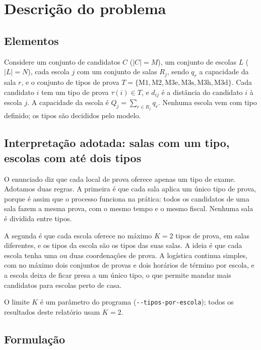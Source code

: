 \documentclass[12pt]{article}
\begin{document}
\section{Descrição do problema}\label{sec:problema}

\subsection{Elementos}

Considere um conjunto de candidatos $C$ ($|C| = M$), um conjunto de escolas $L$ ($|L| = N$), cada
escola $j$ com um conjunto de salas $R_j$, sendo $q_r$ a capacidade da sala $r$, e o conjunto de
tipos de prova $T = \{\mathrm{M1}, \mathrm{M2}, \mathrm{M3e}, \mathrm{M3s}, \mathrm{M3h},
\mathrm{M3d}\}$. Cada candidato $i$ tem um tipo de prova $\tau(i) \in T$, e $d_{ij}$ é a distância
do candidato $i$ à escola $j$. A capacidade da escola é $Q_j = \sum_{r \in R_j} q_r$. Nenhuma
escola vem com tipo definido; os tipos são decididos pelo modelo.

\subsection{Interpretação adotada: salas com um tipo, escolas com até dois tipos}\label{sec:interpretacao}

O enunciado diz que cada local de prova oferece apenas um tipo de exame. Adotamos duas regras. A
primeira é que cada sala aplica um único tipo de prova, porque é assim que o processo funciona na
prática: todos os candidatos de uma sala fazem a mesma prova, com o mesmo tempo e o mesmo fiscal.
Nenhuma sala é dividida entre tipos.

A segunda é que cada escola oferece no máximo $K = 2$ tipos de prova, em salas diferentes, e os
tipos da escola são os tipos das suas salas. A ideia é que cada escola tenha uma ou duas
coordenações de prova. A logística continua simples, com no máximo dois conjuntos de provas e dois
horários de término por escola, e a escola deixa de ficar presa a um único tipo, o que permite
mandar mais candidatos para escolas perto de casa.

O limite $K$ é um parâmetro do programa (\texttt{-{}-tipos-por-escola}); todos os resultados deste
relatório usam $K = 2$.

\subsection{Formulação}
\end{document}
